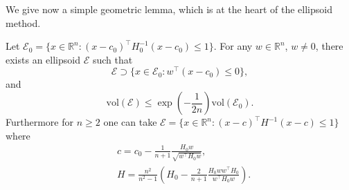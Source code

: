 \documentclass[openany]{now}
\newcommand{\R}{\mathbb{R}}
\newcommand{\cE}{\mathcal{E}}
\begin{document}
We give now a simple geometric lemma, which is at the heart of the ellipsoid method.
\begin{lemma} \label{lem:geomellipsoid}
Let $\mathcal{E}_0 = \{x \in \R^n : (x - c_0)^{\top} H_0^{-1} (x-c_0) \leq 1 \}$. For any $w \in \R^n$, $w \neq 0$, there exists an ellipsoid $\mathcal{E}$ such that
\begin{equation}
\mathcal{E} \supset \{x \in \mathcal{E}_0 : w^{\top} (x-c_0) \leq 0\} , \label{eq:ellipsoidlemma1}
\end{equation}
and 
\begin{equation}
\mathrm{vol}(\mathcal{E}) \leq \exp \left(- \frac{1}{2 n} \right) \mathrm{vol}(\mathcal{E}_0) . \label{eq:ellipsoidlemma2}
\end{equation}
Furthermore for $n \geq 2$ one can take $\cE = \{x \in \R^n : (x - c)^{\top} H^{-1} (x-c) \leq 1 \}$ where
\begin{align}
& c = c_0 - \frac{1}{n+1} \frac{H_0 w}{\sqrt{w^{\top} H_0 w}} , \label{eq:ellipsoidlemma3}\\
& H = \frac{n^2}{n^2-1} \left(H_0 - \frac{2}{n+1} \frac{H_0 w w^{\top} H_0}{w^{\top} H_0 w} \right) . \label{eq:ellipsoidlemma4}
\end{align}
\end{lemma}
\end{document}
